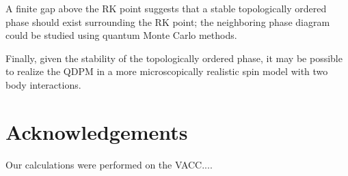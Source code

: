 \documentclass[twocolumn,prb,aps,floatfix,superscriptaddress]{revtex4-1}
\begin{document}
A finite gap above the RK point suggests that a stable topologically ordered phase should exist surrounding the RK point; the neighboring phase diagram could be studied using quantum Monte Carlo methods.

Finally, given the stability of the topologically ordered phase, it may be possible to realize the QDPM in a more microscopically realistic spin model with two body interactions.


\section{Acknowledgements}

Our calculations were performed on the VACC....

\appendix
\end{document}
